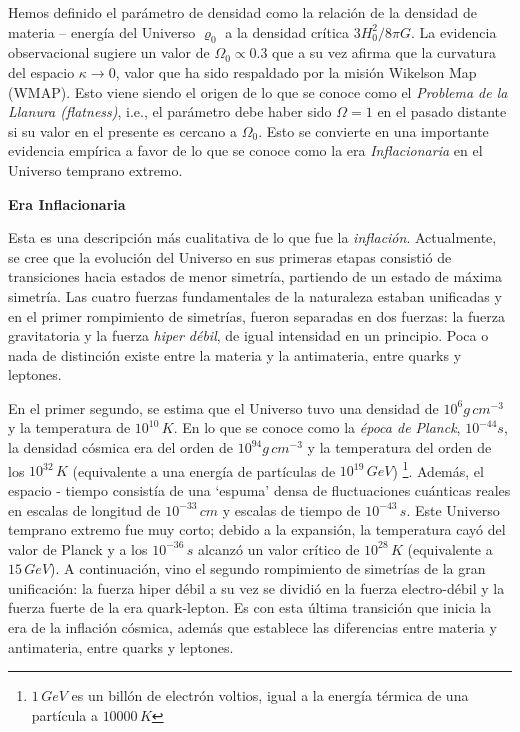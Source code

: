 \documentclass[11pt]{article}
\begin{document}
{    Hemos definido el parámetro de densidad como la relación de la densidad de materia – energía del Universo $\varrho_0$ a la densidad crítica $3H_0^2/8 \pi G$. La evidencia observacional sugiere un valor de $\Omega_0 \propto 0.3$ que a su vez afirma que la curvatura del espacio $\kappa \rightarrow{0}$, valor que ha sido respaldado por la misión Wikelson Map (WMAP). Esto viene siendo el origen de lo que se conoce como el {\textit{Problema de la Llanura (flatness)}}, i.e., el parámetro debe haber sido $\Omega = 1$ en el pasado distante si su valor en el presente es cercano a $\Omega_0$. Esto se convierte en una importante evidencia empírica a favor de lo que se conoce como la era {\textit{Inflacionaria}} en el Universo temprano extremo. 

\large{\textbf{Era Inflacionaria}}


Esta es una descripción más cualitativa de lo que fue la {\textit{inflación}}. Actualmente, se cree que la evolución del Universo en sus primeras etapas consistió de transiciones hacia estados de menor simetría, partiendo de un estado de máxima simetría. Las cuatro fuerzas fundamentales de la naturaleza estaban unificadas y en el primer rompimiento de simetrías, fueron separadas en dos fuerzas: la fuerza gravitatoria y la fuerza {\textit{hiper débil}}, de igual intensidad en un principio. Poca o nada de distinción existe entre la materia y la antimateria, entre quarks y leptones. 

En el primer segundo, se estima que el Universo tuvo una densidad de $10^6 g \, cm^{-3}$ y la temperatura de $10^{10} \, K$. En lo que se conoce como la {\textit{época de Planck}}, $10^{-44} s$, la densidad cósmica era del orden de $10^{94} g \, cm^{-3}$ y la temperatura del orden de los $10^{32} \, K$ (equivalente a una energía de partículas de $10^{19} \, GeV$) {\footnote{$1 \,GeV$ es un billón de electrón voltios, igual a la energía térmica de una partícula a $10000 \,K$}}. Además, el espacio -  tiempo consistía de una `espuma' densa de fluctuaciones cuánticas reales en escalas de longitud de $10^{-33} \, cm$ y escalas de tiempo de $10^{-43} \, s$. Este Universo temprano extremo fue muy corto; debido a la expansión, la temperatura cayó del valor de Planck y a los $10^{-36} \, s$ alcanzó un valor crítico de $10^{28} \, K$ (equivalente a $15 \, GeV$). A continuación, vino el segundo rompimiento de simetrías de la gran unificación: la fuerza hiper débil a su vez se dividió en la fuerza electro-débil y la fuerza fuerte de la era quark-lepton. Es con esta última transición que inicia la era de la inflación cósmica, además que establece las diferencias entre materia y antimateria, entre quarks y leptones.

}
\end{document}
